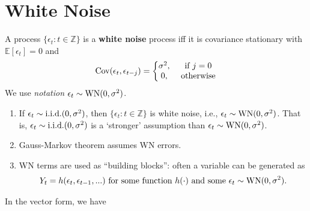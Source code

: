 \documentclass[11pt]{elegantbook}
\begin{document}
\section{White Noise}
\begin{definition}
    A process $\{\epsilon_t:t\in \mathbb{Z}\}$ is a \textbf{white noise} process iff it is covariance stationary with $\mathbb{E}[\epsilon_t]=0$ and
    \begin{equation}
        \begin{aligned}
            \textnormal{Cov}(\epsilon_t,\epsilon_{t-j})=\left\{\begin{matrix}
                \sigma^2,& \textnormal{ if }j=0\\
                0,& \textnormal{ otherwise}
            \end{matrix}\right.
        \end{aligned}
        \nonumber
    \end{equation}
    We use \textit{notation} $\epsilon_t\sim \textnormal{WN}(0,\sigma^2)$.
\end{definition}
\begin{note}
    \begin{enumerate}
        \item If $\epsilon_t\sim \textnormal{i.i.d.}(0,\sigma^2)$, then $\{\epsilon_t:t\in \mathbb{Z}\}$ is white noise, i.e., $\epsilon_t\sim \textnormal{WN}(0,\sigma^2)$. That is, $\epsilon_t\sim \textnormal{i.i.d.}(0,\sigma^2)$ is a `stronger' assumption than $\epsilon_t\sim \textnormal{WN}(0,\sigma^2)$.
        \item Gauss-Markov theorem assumes WN errors.
        \item WN terms are used as ``building blocks'': often a variable can be generated as
        \begin{equation}
            \begin{aligned}
                Y_t=h(\epsilon_t,\epsilon_{t-1},...) \textnormal{ for some function $h(\cdot)$ and some $\epsilon_t\sim \textnormal{WN}(0,\sigma^2)$.}
            \end{aligned}
            \nonumber
        \end{equation}
    \end{enumerate}
\end{note}
In the vector form, we have
\end{document}
